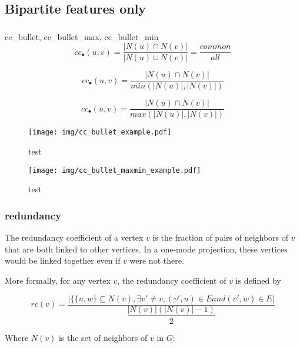 \documentclass[table]{report}
\begin{document}
\subsection{Bipartite features only}
\subsubsection{}

cc\_bullet, cc\_bullet\_max, cc\_bullet\_min
$$cc_{\bullet}(u,v)=\dfrac{|N(u)\cap N(v)|}
						  {|N(u)\cup N(v)|} = \dfrac{common}{all}$$
						  
						  
$$cc_{\bullet}(u,v)=\dfrac{|N(u)\cap N(v)|}
						  {min(|N(u)|,|N(v)|)}$$
		
$$cc_{\bullet}(u,v)=\dfrac{|N(u)\cap N(v)|}
						  {max(|N(u)|,|N(v)|)}$$
						  
\begin{figure}[h]%
\centering
\texttt{[image: img/cc\_bullet\_example.pdf]}
\caption{test}

\label{fig:cc_bullet_example}
\end{figure}
\FloatBarrier


						  
\begin{figure}[h]%
\centering
\texttt{[image: img/cc\_bullet\_maxmin\_example.pdf]}
\caption{test}

\label{fig:cc_bullet_maxmin_example}
\end{figure}
\FloatBarrier



						  				  
\subsubsection{redundancy}

The redundancy coefficient of a vertex $v$ is the fraction of pairs of neighbors of $v$ that are both linked to other vertices. In a one-mode projection, these vertices would be linked together even if $v$ were not there.

More formally, for any vertex $v$, the redundancy coefficient of $v$ is defined by


$$rc(v)= \dfrac{|\{\{u,w\} \subseteq N(v), \exists v' \neq v, (v',u) \in E and (v',w) \in E|}{\dfrac{|N(v)| (|N(v)|-1)}{2}}$$

Where $N(v)$ is the set of neighbors of $v$ in $G$:
\end{document}
